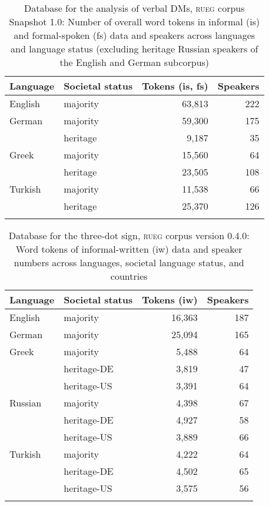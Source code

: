 \documentclass[output=paper,colorlinks,citecolor=brown]{langscibook}
\begin{document}
\begin{table}
\caption{Database for the analysis of verbal DMs, \textsc{rueg} corpus Snapshot 1.0: Number of overall word tokens in informal (is) and formal-spoken (fs) data and speakers across languages and language status (excluding heritage Russian speakers of the English and German subcorpus)}
\label{tab:labrenzetal:1}
 \begin{tabular}{l lrr}
  \lsptoprule
      Language      & Societal status & Tokens (is, fs)  & Speakers\\
  \midrule
  English  &   majority  &    63,813  &    222\\
  \midrule
  German  &   majority  &   59,300  &    175\\
          &   heritage  &  9,187  &  35\\
  \midrule
  Greek  &  majority  &  15,560  &  64\\
         & heritage  &  23,505  &  108\\
  \midrule
  Turkish  &  majority  &  11,538  &  66\\
           &  heritage  &  25,370  &  126\\
  \lspbottomrule
 \end{tabular}
\end{table}

\begin{table}
\caption{Database for the three-dot sign, \textsc{rueg} corpus version 0.4.0: Word tokens of informal-written (iw) data and speaker numbers across languages, societal language status, and countries}
\label{tab:labrenzetal:2}
 \begin{tabular}{l lrr}
  \lsptoprule
      Language      & Societal status & Tokens (iw)  & Speakers\\
  \midrule
  English  &   majority  &    16,363  &    187\\
  \midrule
  German  &   majority  &   25,094  &    165\\
  \midrule
  Greek  &  majority    &  5,488  &  64\\
         & heritage-DE  &  3,819  &  47\\
         & heritage-US  &  3,391  &  64\\
  \midrule
  Russian  &  majority     &  4,398  &  67\\
           &  heritage-DE  &  4,927  &  58\\
           &  heritage-US  &  3,889  &  66\\
  \midrule
  Turkish  &  majority     &  4,222  &  64\\
           &  heritage-DE  &  4,502  &  65\\
           &  heritage-US  &  3,575  &  56\\
  \lspbottomrule
 \end{tabular}
\end{table}
\end{document}
